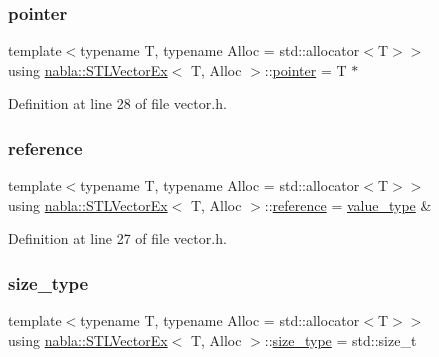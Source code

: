 \subsubsection{\texorpdfstring{pointer}{pointer}}
{\footnotesize\ttfamily template$<$typename T, typename Alloc = std\+::allocator$<$\+T$>$$>$ \\
using \mbox{\hyperlink{classnabla_1_1_s_t_l_vector_ex}{nabla\+::\+S\+T\+L\+Vector\+Ex}}$<$ T, Alloc $>$\+::\mbox{\hyperlink{classnabla_1_1_s_t_l_vector_ex_a396f1267c3ea9874a98905cad4137af3}{pointer}} =  T $\ast$}



Definition at line 28 of file vector.\+h.

\mbox{\label{classnabla_1_1_s_t_l_vector_ex_a6adf5d87234352c139af2d48f4787ed5}} 
\subsubsection{\texorpdfstring{reference}{reference}}
{\footnotesize\ttfamily template$<$typename T, typename Alloc = std\+::allocator$<$\+T$>$$>$ \\
using \mbox{\hyperlink{classnabla_1_1_s_t_l_vector_ex}{nabla\+::\+S\+T\+L\+Vector\+Ex}}$<$ T, Alloc $>$\+::\mbox{\hyperlink{classnabla_1_1_s_t_l_vector_ex_a6adf5d87234352c139af2d48f4787ed5}{reference}} =  \mbox{\hyperlink{classnabla_1_1_s_t_l_vector_ex_a6af5809443fb78a0fe7321ff93e2ad4c}{value\+\_\+type}} \&}



Definition at line 27 of file vector.\+h.

\mbox{\label{classnabla_1_1_s_t_l_vector_ex_a288a7552f71d4e0cbeb12e6a6d5e7fd3}} 
\subsubsection{\texorpdfstring{size\_type}{size\_type}}
{\footnotesize\ttfamily template$<$typename T, typename Alloc = std\+::allocator$<$\+T$>$$>$ \\
using \mbox{\hyperlink{classnabla_1_1_s_t_l_vector_ex}{nabla\+::\+S\+T\+L\+Vector\+Ex}}$<$ T, Alloc $>$\+::\mbox{\hyperlink{classnabla_1_1_s_t_l_vector_ex_a288a7552f71d4e0cbeb12e6a6d5e7fd3}{size\+\_\+type}} =  std\+::size\+\_\+t}



